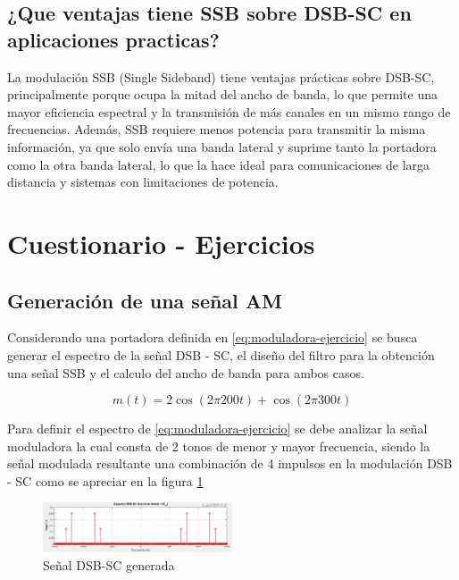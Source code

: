 \documentclass[conference]{IEEEtran}
\begin{document}
	\subsection{\textbf{¿Que ventajas tiene SSB sobre DSB-SC en aplicaciones practicas?}}
	La modulación SSB (Single Sideband) tiene ventajas prácticas sobre DSB-SC, principalmente porque ocupa la mitad del ancho de banda, lo que permite una mayor eficiencia espectral y la transmisión de más canales en un mismo rango de frecuencias. Además, SSB requiere menos potencia para transmitir la misma información, ya que solo envía una banda lateral y suprime tanto la portadora como la otra banda lateral, lo que la hace ideal para comunicaciones de larga distancia y sistemas con limitaciones de potencia.
	
	\section{Cuestionario - Ejercicios}
	
	\subsection{\textbf{Generación de una señal AM}}
	
	Considerando una portadora definida en \ref{eq:moduladora-ejercicio} se busca generar el espectro de la señal DSB - SC, el diseño del filtro para la obtención una señal SSB y el calculo del ancho de banda para ambos casos.
	
	\begin{equation}
		m(t) = 2\cos(2\pi 200t) + \cos(2\pi 300t)
		\label{eq:moduladora-ejercicio}
	\end{equation}
	
	Para definir el espectro de \ref{eq:moduladora-ejercicio} se debe analizar la señal moduladora la cual consta de 2 tonos de menor y mayor frecuencia, siendo la señal modulada resultante una combinación de 4 impulsos en la modulación DSB - SC como se apreciar en la figura \ref{fig:dsb-sc-ejercicio}
	
	\begin{figure}[h]
		\centering
		\includegraphics[width=0.5\textwidth]{media/dsb-sc-ejercicio}
		\caption{Señal DSB-SC generada}
		\label{fig:dsb-sc-ejercicio}
	\end{figure}
	
\end{document}
